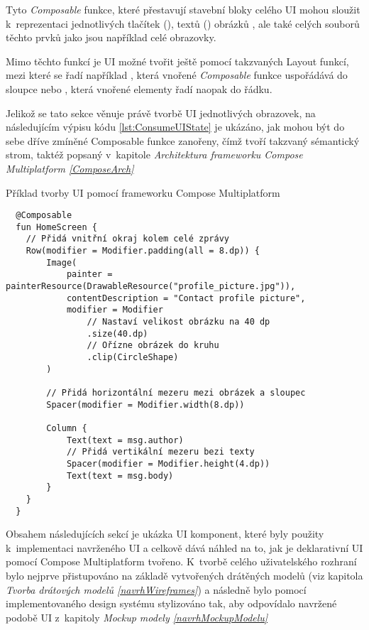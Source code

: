 Tyto \textit{Composable} funkce, které přestavují stavební bloky celého UI mohou sloužit k~reprezentaci jednotlivých tlačítek (), 
textů () obrázků , ale také celých souborů těchto prvků jako jsou například celé obrazovky.

Mimo těchto funkcí je UI možné tvořit ještě pomocí takzvaných Layout funkcí, mezi které se řadí například , která vnořené \textit{Composable}
funkce uspořádává do sloupce nebo , která vnořené elementy řadí naopak do řádku.

Jelikož se tato sekce věnuje právě tvorbě UI jednotlivých obrazovek, na následujícím výpisu kódu \ref{lst:ConsumeUIState} je ukázáno, jak mohou
 být do sebe dříve zmíněné Composable funkce zanořeny, čímž tvoří takzvaný sémantický strom, taktéž popsaný v~kapitole 
 \textit{Architektura frameworku Compose Multiplatform \ref{ComposeArch}}

\begin{listing}[H]
\caption{Příklad tvorby UI pomocí frameworku Compose Multiplatform}\label{lst:ConsumeUIState}
\begin{verbatim}
  @Composable
  fun HomeScreen {
    // Přidá vnitřní okraj kolem celé zprávy
    Row(modifier = Modifier.padding(all = 8.dp)) {
        Image(
            painter = painterResource(DrawableResource("profile_picture.jpg")),
            contentDescription = "Contact profile picture",
            modifier = Modifier
                // Nastaví velikost obrázku na 40 dp
                .size(40.dp)
                // Ořízne obrázek do kruhu
                .clip(CircleShape)
        )

        // Přidá horizontální mezeru mezi obrázek a sloupec
        Spacer(modifier = Modifier.width(8.dp))

        Column {
            Text(text = msg.author)
            // Přidá vertikální mezeru bezi texty
            Spacer(modifier = Modifier.height(4.dp))
            Text(text = msg.body)
        }
    }
  }
\end{verbatim}
\end{listing}



Obsahem následujících sekcí je ukázka UI komponent, které byly použity k~implementaci navrženého UI a celkově dává náhled na to,
jak je deklarativní UI pomocí Compose Multiplatform tvořeno. K~tvorbě celého uživatelského rozhraní bylo nejprve přistupováno na základě vytvořených 
drátěných modelů (viz kapitola \textit{Tvorba drátových modelů \ref{navrhWireframes}}) a následně bylo pomocí implementovaného design systému
stylizováno tak, aby odpovídalo navržené podobě UI z~kapitoly \textit{Mockup modely \ref{navrhMockupModelu}}

